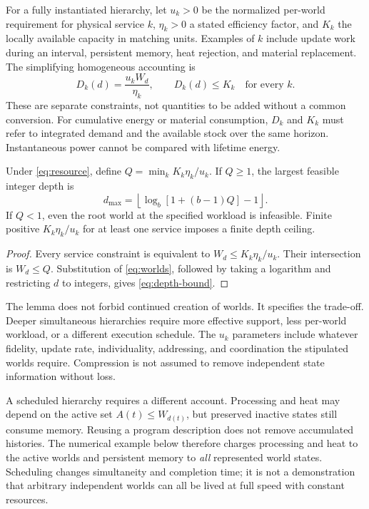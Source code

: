 For a fully instantiated hierarchy, let $u_k>0$ be the normalized per-world requirement for physical service $k$, $\eta_k>0$ a stated efficiency factor, and $K_k$ the locally available capacity in matching units. Examples of $k$ include update work during an interval, persistent memory, heat rejection, and material replacement. The simplifying homogeneous accounting is
\begin{equation}
 D_k(d)=\frac{u_kW_d}{\eta_k},\qquad D_k(d)\leq K_k\quad\text{for every }k.
 \label{eq:resource}
\end{equation}
These are separate constraints, not quantities to be added without a common conversion. For cumulative energy or material consumption, $D_k$ and $K_k$ must refer to integrated demand and the available stock over the same horizon. Instantaneous power cannot be compared with lifetime energy.

\begin{lemma}
\label{prop:depth}
Under \cref{eq:resource}, define $Q=\min_k K_k\eta_k/u_k$. If $Q\geq1$, the largest feasible integer depth is
\begin{equation}
 d_{\max}=\left\lfloor\log_b[1+(b-1)Q]-1\right\rfloor.
 \label{eq:depth-bound}
\end{equation}
If $Q<1$, even the root world at the specified workload is infeasible. Finite positive $K_k\eta_k/u_k$ for at least one service imposes a finite depth ceiling.
\end{lemma}
\begin{proof}
Every service constraint is equivalent to $W_d\leq K_k\eta_k/u_k$. Their intersection is $W_d\leq Q$. Substitution of \cref{eq:worlds}, followed by taking a logarithm and restricting $d$ to integers, gives \cref{eq:depth-bound}.
\end{proof}

The lemma does not forbid continued creation of worlds. It specifies the trade-off. Deeper simultaneous hierarchies require more effective support, less per-world workload, or a different execution schedule. The $u_k$ parameters include whatever fidelity, update rate, individuality, addressing, and coordination the stipulated worlds require. Compression is not assumed to remove independent state information without loss.

A scheduled hierarchy requires a different account. Processing and heat may depend on the active set $A(t)\leq W_{d(t)}$, but preserved inactive states still consume memory. Reusing a program description does not remove accumulated histories. The numerical example below therefore charges processing and heat to the active worlds and persistent memory to \emph{all} represented world states. Scheduling changes simultaneity and completion time; it is not a demonstration that arbitrary independent worlds can all be lived at full speed with constant resources.


